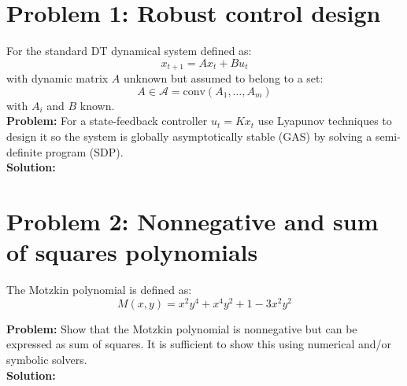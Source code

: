 \documentclass[letter]{article}
\begin{document}
\newpage
\section{Problem 1: Robust control design}
For the standard DT dynamical system defined as:
\begin{equation}
	x_{t+1} = A x_t + B u_t
\end{equation}
with dynamic matrix $A$ unknown but assumed to belong to a set:
\begin{equation}
	A \in \mathcal{A} = \text{conv}(A_1,\dots,A_m)
\end{equation}
with $A_i$ and $B$ known.\\


\textbf{Problem:}
For a state-feedback controller $u_t = K x_t$ use Lyapunov techniques to design it so the system is globally asymptotically stable (GAS) by solving a semi-definite program (SDP).\\

\textbf{Solution:}










\newpage
\section{Problem 2: Nonnegative and sum of squares polynomials}
The Motzkin polynomial is defined as:
\begin{equation}
	M(x,y) = x^2 y^4 + x^4 y^2 + 1 - 3 x^2 y^2
\end{equation}

\textbf{Problem:}
Show that the Motzkin polynomial is nonnegative but can be expressed as sum of squares. It is sufficient to show this using numerical and/or symbolic solvers.\\

\textbf{Solution:}











%
\end{document}
